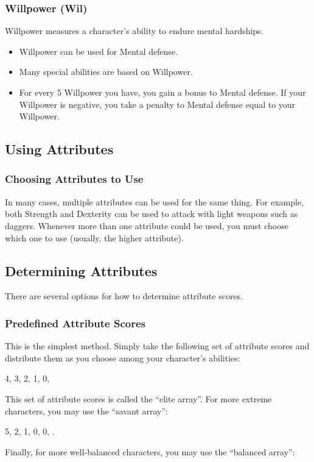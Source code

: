 \subsubsection{Willpower (Wil)}\label{Willpower}
Willpower measures a character's ability to endure mental hardships.
\begin{itemize}
    \item Willpower can be used for Mental defense.
    \item Many special abilities are based on Willpower.
    \item For every 5 Willpower you have, you gain a  bonus to Mental defense. If your Willpower is negative, you take a penalty to Mental defense equal to your Willpower.
\end{itemize}

\subsection{Using Attributes}

\subsubsection{Choosing Attributes to Use}
In many cases, multiple attributes can be used for the same thing.
For example, both Strength and Dexterity can be used to attack with light weapons such as daggers.
Whenever more than one attribute could be used, you must choose which one to use (usually, the higher attribute).

\subsection{Determining Attributes}
There are several options for how to determine attribute scores.

\subsubsection{Predefined Attribute Scores}
This is the simplest method.
Simply take the following set of attribute scores and distribute them as you choose among your character's abilities:

4, 3, 2, 1, 0, 

This set of attribute scores is called the ``elite array''.
For more extreme characters, you may use the ``savant array'':

5, 2, 1, 0, 0, .

Finally, for more well-balanced characters, you may use the ``balanced array'':

